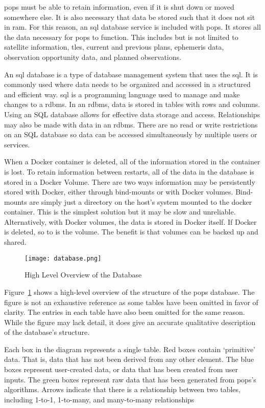 \gls{pops} must be able to retain information, even if it is
shut down or moved somewhere else. It is also necessary that data be stored
such that it does not sit in \gls{ram}. For this reason, an \acrshort{sql}
database service is included with \gls{pops}. It stores all the data necessary
for \gls{pops} to function. This includes but is not limited to satellite
information, \glspl{tle}, current and previous plans, ephemeris data,
observation opportunity data, and planned observations. 

An \acrshort{sql} database is a type of database management system that uses
the \gls{sql}. It is commonly used where data needs to be organized and
accessed in a structured and efficient way. \gls{sql} is a programming language
used to manage and make changes to a \gls{rdbms}. In an \gls{rdbms}, data is
stored in tables with rows and columns. Using an SQL database allows for
effective data storage and access. Relationships may also be made with data in
an \gls{rdbms}. There are no read or write restrictions on an SQL database so
data can be accessed simultaneously by multiple users or services.

When a Docker container is deleted, all of the information stored in the
container is lost. To retain information between restarts, all of the data in
the database is stored in a Docker Volume. There are two ways information may
be persistently stored with Docker, either through bind-mounts or with Docker
volumes. Bind-mounts are simply just a directory on the host's system mounted
to the docker container. This is the simplest solution but it may be slow and
unreliable. Alternatively, with Docker volumes, the data is stored in Docker
itself. If Docker is deleted, so to is the volume. The benefit is that volumes
can be backed up and shared.

\begin{figure}
    \centering
    \texttt{[image: database.png]} 
    \caption{High Level Overview of the Database}
    \label{fig:database} 
\end{figure}

Figure~\ref{fig:database} shows a high-level overview of the structure of the
\gls{pops} database. The figure is not an exhaustive reference as some tables
have been omitted in favor of clarity. The entries in each table have also been
omitted for the same reason. While the figure may lack detail, it does give an
accurate qualitative description of the database's structure. 

Each box in the diagram represents a single table. Red boxes contain
`primitive' data. That is, data that has not been derived from any other
element. The blue boxes represent user-created data, or data that has been
created from user inputs. The green boxes represent raw data that has been
generated from \gls{pops}'s algorithms. Arrows indicate that there is a
relationship between two tables, including 1-to-1, 1-to-many, and many-to-many
relationships

